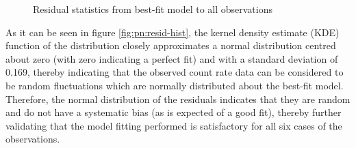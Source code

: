     		\begin{figure}[h!]
				\centering				
				 \hfill				
				\caption{Residual statistics from best-fit model to all observations}
		        \label{fig:all-obs:resid-stats}
			\end{figure}
			
			As it can be seen in figure \ref{fig:pn:resid-hist}, the kernel density estimate (KDE) function of the distribution closely approximates a normal distribution centred about zero (with zero indicating a perfect fit) and with a standard deviation of 0.169, thereby indicating that the observed count rate data can be considered to be random fluctuations which are normally distributed about the best-fit model. Therefore, the normal distribution of the residuals indicates that they are random and do not have a systematic bias (as is expected of a good fit), thereby further validating that the model fitting performed is satisfactory for all six cases of the observations.
			
